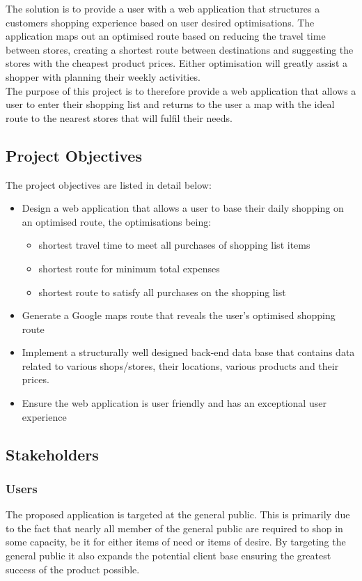 \documentclass[10pt,twocolumn]{witseiepaper}
\begin{document}
		The solution is to provide a user with a web application that structures a customers shopping experience based on user desired optimisations. The application maps out an optimised route based on reducing the travel time between stores, creating a shortest route between destinations and suggesting the stores with the cheapest product prices. Either optimisation will greatly assist a shopper with planning their weekly activities. \\
		
		The purpose of this project is to therefore provide a web application that allows a user to enter their shopping list and returns to the user a map with the ideal route to the nearest stores that will fulfil their needs. 

	\subsection{Project Objectives}

		The project objectives are listed in detail below:

		\begin{itemize}
			\item Design a web application that allows a user to base their daily shopping on an optimised route, the optimisations being:
			\begin{itemize}
				\item shortest travel time to meet all purchases of shopping list items 
				\item shortest route for minimum total expenses
				\item shortest route to satisfy all purchases on the shopping list 
			\end{itemize}
			\item Generate a Google maps route that reveals the user's optimised shopping route
			\item Implement a structurally well designed back-end data base that contains data related to various shops/stores, their locations, various products and their prices.
			\item Ensure the web application is user friendly and has an exceptional user experience
		\end{itemize}

	\subsection{Stakeholders}
		
		\subsubsection{Users} The proposed application is targeted at the general public. This is primarily due to the fact that nearly all member of the general public are required to shop in some capacity, be it for either items of need or items of desire. By targeting the general public it also expands the potential client base ensuring the greatest success of the product possible.\\
		
\end{document}
